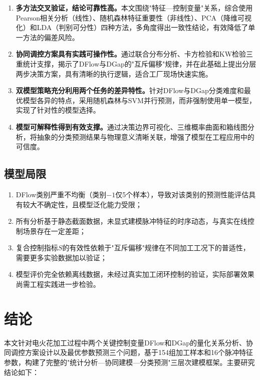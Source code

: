 \documentclass[UTF8,a4paper,12pt]{ctexart}
\begin{document}
\begin{enumerate}[label=(\arabic*),leftmargin=2em]
\item \textbf{多方法交叉验证，结论可靠性高。}本文围绕"特征—控制变量"关系，综合使用Pearson相关分析（线性）、随机森林特征重要性（非线性）、PCA（降维可视化）和LDA（判别可分性）四种方法，多角度得出一致性结论，有效降低了单一方法的偏差风险。

\item \textbf{协同调控方案具有实践可操作性。}通过联合分布分析、卡方检验和KW检验三重统计支撑，揭示了DFlow与DGap的"互斥偏移"规律，并在此基础上提出分层两步决策方案，具有清晰的执行逻辑，适合工厂现场快速实施。

\item \textbf{双模型策略充分利用两个任务的差异特性。}针对DFlow与DGap分类难度和最优模型各异的特点，采用随机森林与SVM并行预测，而非强制使用单一模型，实现了针对性的模型选择。

\item \textbf{模型可解释性得到有效支撑。}通过决策边界可视化、三维概率曲面和箱线图分析，将抽象的分类预测结果与物理意义清晰关联，增强了模型在工程应用中的可信度。
\end{enumerate}

\subsection{模型局限}

\begin{enumerate}[label=(\arabic*),leftmargin=2em]
\item DFlow类别严重不均衡（类别$-1$仅5个样本），导致对该类别的预测性能评估具有较大不确定性，且模型泛化能力受限；
\item 所有分析基于静态截面数据，未显式建模脉冲特征的时序动态，与真实在线控制场景存在一定差距；
\item 复合控制指标$S$的有效性依赖于"互斥偏移"规律在不同加工工况下的普适性，需要更多实验数据加以验证；
\item 模型评价完全依赖离线数据，未经过真实加工闭环控制的验证，实际部署效果尚需工程实践进一步检验。
\end{enumerate}

\section{结论}

本文针对电火花加工过程中两个关键控制变量DFlow和DGap的量化关系分析、协同调控方案设计以及最优参数预测三个问题，基于154组加工样本和16个脉冲特征参数，构建了完整的"统计分析—协同建模—分类预测"三层次建模框架。主要研究结论如下：
\end{document}
